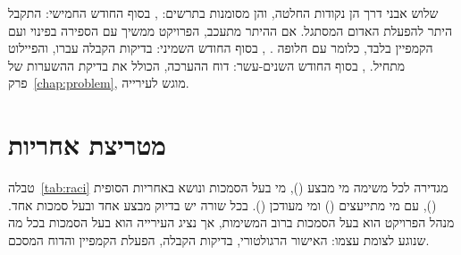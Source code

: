 שלוש אבני דרך הן נקודות החלטה, והן מסומנות בתרשים:
, בסוף החודש החמישי: התקבל היתר להפעלת האדום המסתגל. אם ההיתר מתעכב, הפרויקט ממשיך עם הספירה בפינוי ועם הקמפיין בלבד, כלומר עם חלופה .
, בסוף החודש השמיני: בדיקות הקבלה עברו, והפיילוט מתחיל.
, בסוף החודש השנים-עשר: דוח ההערכה, הכולל את בדיקת ההשערות של פרק~\ref{chap:problem}, מוגש לעירייה.

\section{מטריצת אחריות}
טבלה~\ref{tab:raci} מגדירה לכל משימה מי מבצע (), מי בעל הסמכות ונושא באחריות הסופית (), עם מי מתייעצים () ומי מעודכן ().
בכל שורה יש בדיוק מבצע אחד ובעל סמכות אחד. מנהל הפרויקט הוא בעל הסמכות ברוב המשימות, אך נציג העירייה הוא בעל הסמכות בכל מה שנוגע לצומת עצמו: האישור הרגולטורי, בדיקות הקבלה, הפעלת הקמפיין והדוח המסכם.

